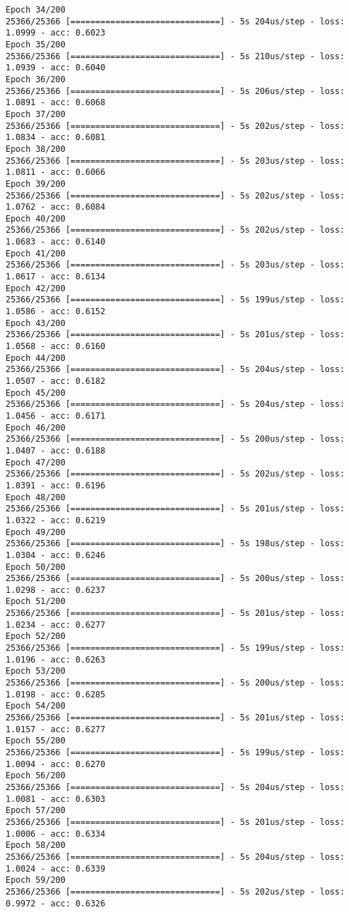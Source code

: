 \documentclass[11pt]{article}
\begin{document}
\begin{Verbatim}[commandchars=\\\{\}]
Epoch 34/200
25366/25366 [==============================] - 5s 204us/step - loss: 1.0999 - acc: 0.6023
Epoch 35/200
25366/25366 [==============================] - 5s 210us/step - loss: 1.0939 - acc: 0.6040
Epoch 36/200
25366/25366 [==============================] - 5s 206us/step - loss: 1.0891 - acc: 0.6068
Epoch 37/200
25366/25366 [==============================] - 5s 202us/step - loss: 1.0834 - acc: 0.6081
Epoch 38/200
25366/25366 [==============================] - 5s 203us/step - loss: 1.0811 - acc: 0.6066
Epoch 39/200
25366/25366 [==============================] - 5s 202us/step - loss: 1.0762 - acc: 0.6084
Epoch 40/200
25366/25366 [==============================] - 5s 202us/step - loss: 1.0683 - acc: 0.6140
Epoch 41/200
25366/25366 [==============================] - 5s 203us/step - loss: 1.0617 - acc: 0.6134
Epoch 42/200
25366/25366 [==============================] - 5s 199us/step - loss: 1.0586 - acc: 0.6152
Epoch 43/200
25366/25366 [==============================] - 5s 201us/step - loss: 1.0568 - acc: 0.6160
Epoch 44/200
25366/25366 [==============================] - 5s 204us/step - loss: 1.0507 - acc: 0.6182
Epoch 45/200
25366/25366 [==============================] - 5s 204us/step - loss: 1.0456 - acc: 0.6171
Epoch 46/200
25366/25366 [==============================] - 5s 200us/step - loss: 1.0407 - acc: 0.6188
Epoch 47/200
25366/25366 [==============================] - 5s 202us/step - loss: 1.0391 - acc: 0.6196
Epoch 48/200
25366/25366 [==============================] - 5s 201us/step - loss: 1.0322 - acc: 0.6219
Epoch 49/200
25366/25366 [==============================] - 5s 198us/step - loss: 1.0304 - acc: 0.6246
Epoch 50/200
25366/25366 [==============================] - 5s 200us/step - loss: 1.0298 - acc: 0.6237
Epoch 51/200
25366/25366 [==============================] - 5s 201us/step - loss: 1.0234 - acc: 0.6277
Epoch 52/200
25366/25366 [==============================] - 5s 199us/step - loss: 1.0196 - acc: 0.6263
Epoch 53/200
25366/25366 [==============================] - 5s 200us/step - loss: 1.0198 - acc: 0.6285
Epoch 54/200
25366/25366 [==============================] - 5s 201us/step - loss: 1.0157 - acc: 0.6277
Epoch 55/200
25366/25366 [==============================] - 5s 199us/step - loss: 1.0094 - acc: 0.6270
Epoch 56/200
25366/25366 [==============================] - 5s 204us/step - loss: 1.0081 - acc: 0.6303
Epoch 57/200
25366/25366 [==============================] - 5s 201us/step - loss: 1.0006 - acc: 0.6334
Epoch 58/200
25366/25366 [==============================] - 5s 204us/step - loss: 1.0024 - acc: 0.6339
Epoch 59/200
25366/25366 [==============================] - 5s 202us/step - loss: 0.9972 - acc: 0.6326

\end{Verbatim}
\end{document}
